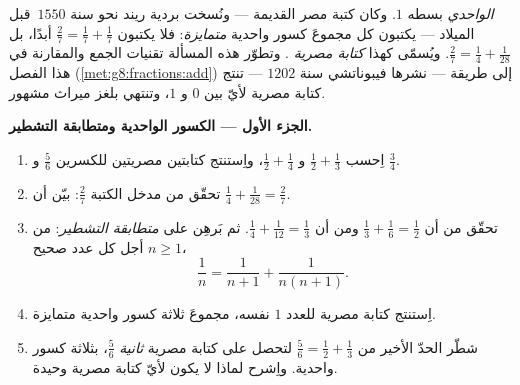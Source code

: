 \begin{problem}
\label{pb:g8:fractions:1}
\emph{ الواحدي}  بسطه $1$. وكان
كتبة مصر القديمة --- ونُسخت بردية ريند نحو سنة
$1550$~قبل الميلاد --- يكتبون كل  مجموعَ كسور واحدية
\emph{متمايزة}: فلا يكتبون $\frac27 = \frac17 + \frac17$ أبدًا، بل
$\frac27 = \frac14 + \frac{1}{28}$. ويُسمّى  كهذا
\emph{كتابة مصرية} . وتطوّر هذه المسألة
تقنيات الجمع والمقارنة في هذا الفصل
(\cref{met:g8:fractions:add}) إلى طريقة --- نشرها
فيبوناتشي سنة $1202$ --- تنتج كتابة مصرية لأيّ
 بين $0$ و $1$، وتنتهي بلغز ميراث
مشهور.

\medskip
\noindent\textbf{الجزء الأول --- الكسور الواحدية ومتطابقة
التشطير.}
\begin{enumerate}
  \item اِحسب $\frac12 + \frac13$ و $\frac12 + \frac14$، واِستنتج
        كتابتين مصريتين للكسرين $\frac56$ و $\frac34$.
  \item تحقّق من مدخل الكتبة  $\frac27$: بيّن أن
        $\frac14 + \frac{1}{28} = \frac27$.
  \item تحقّق من أن $\frac13 + \frac16 = \frac12$ ومن أن
        $\frac14 + \frac{1}{12} = \frac13$. ثم بَرهِن على
        \emph{متطابقة التشطير}: من أجل كل عدد صحيح
        $n \geq 1$،
        \[
        \frac{1}{n} = \frac{1}{n+1} + \frac{1}{n(n+1)} .
        \]
  \item اِستنتج كتابة مصرية للعدد $1$ نفسه، مجموعَ
        ثلاثة كسور واحدية متمايزة.
  \item شطّر الحدّ الأخير من $\frac56 = \frac12 + \frac13$
        لتحصل على كتابة مصرية \emph{ثانية}  $\frac56$، بثلاثة
        كسور واحدية. واِشرح لماذا لا يكون لأيّ  كتابة
        مصرية وحيدة.
\end{enumerate}


\end{problem}
